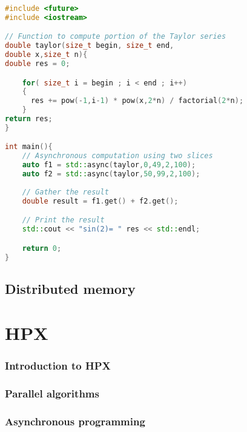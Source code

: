 \documentclass[11pt,fleqn]{book} %
\begin{document}
\begin{lstlisting}[language=c++,caption={Asynchronous computation of the $\sin$ function using a Taylor series.\label{code:async:taylor}},float,floatplacement=tb]
#include <future>
#include <iostream>

// Function to compute portion of the Taylor series
double taylor(size_t begin, size_t end, 
double x,size_t n){
double res = 0;

	for( size_t i = begin ; i < end ; i++)
	{
	  res += pow(-1,i-1) * pow(x,2*n) / factorial(2*n);
	} 
return res;
}

int main(){
	// Asynchronous computation using two slices
	auto f1 = std::async(taylor,0,49,2,100); 
	auto f2 = std::async(taylor,50,99,2,100); 
	
	// Gather the result
	double result = f1.get() + f2.get();

	// Print the result
	std::cout << "sin(2)= " res << std::endl;

	return 0;
}
\end{lstlisting}


\chapter{Distributed memory}


\newpage
\theendnotes


\part{HPX}
\label{sec:hpx}

\section{Introduction to HPX}

\section{Parallel algorithms}

\section{Asynchronous programming}
\end{document}
